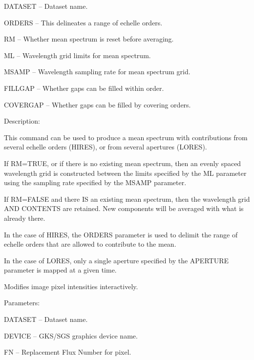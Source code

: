 \begin {description}
\begin {description}
\begin {description}
\item DATASET -- Dataset name.
\item ORDERS -- This delineates a range of echelle orders.
\item RM -- Whether mean spectrum is reset before averaging.
\item ML -- Wavelength grid limits for mean spectrum.
\item MSAMP -- Wavelength sampling rate for mean spectrum grid.
\item FILLGAP -- Whether gaps can be filled within order.
\item COVERGAP -- Whether gaps can be filled by covering orders.
\end {description}

\item Description:

This command can be used to produce a mean spectrum with contributions
from several echelle orders (HIRES), or from several apertures (LORES).

If RM=TRUE, or if there is no existing mean spectrum, then an
evenly spaced wavelength grid is constructed between the
limits specified by the ML parameter using the sampling rate
specified by the MSAMP parameter.

If RM=FALSE and there IS an existing mean spectrum, then the wavelength
grid AND CONTENTS are retained.
New components will be averaged with what is already there.

In the case of HIRES, the ORDERS parameter is used to delimit the range
of echelle orders that are allowed to contribute to the mean.

In the case of LORES, only a single aperture specified by the 
APERTURE parameter is mapped at a given time.
\end {description}

\item [MODIMAGE]
Modifies image pixel intensities interactively.

\begin {description}
\item Parameters:

\begin {description}
\item DATASET -- Dataset name.
\item DEVICE -- GKS/SGS graphics device name.
\item FN -- Replacement Flux Number for pixel.
\end {description}


\end{description}
\end{description}
